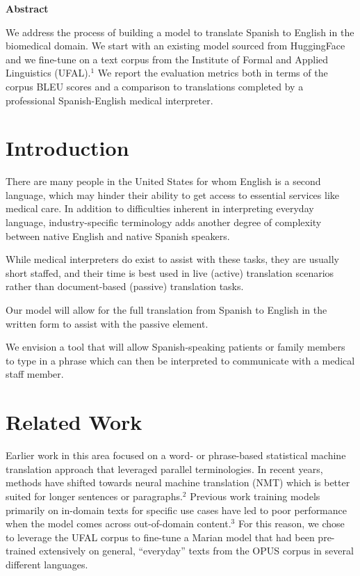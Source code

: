 \documentclass{article}
\begin{document}
\begin{multicols}{2}
\begingroup
\centering
    \textbf{Abstract}\\
\endgroup

We address the process of building a model to translate Spanish to English in the biomedical domain. We start with an existing model sourced from HuggingFace and we fine-tune on a text corpus from the Institute of Formal and Applied Linguistics (UFAL).$^{1}$  We report the evaluation metrics both in terms of the corpus BLEU scores and a comparison to translations completed by a professional Spanish-English medical interpreter.

\section{Introduction }
There are many people in the United States for whom English is a second language, which may hinder their ability to get access to essential services like medical care. In addition to difficulties inherent in interpreting everyday language, industry-specific terminology adds another degree of complexity between native English and native Spanish speakers. 

While medical interpreters do exist to assist with these tasks, they are usually short staffed, and their time is best used in live (active) translation scenarios rather than document-based (passive) translation tasks. 

\columnbreak %

Our model will allow for the full translation from Spanish to English in the  written form to assist with the passive element. 

We envision a tool that will allow Spanish-speaking patients or family members to type in a phrase which can then be interpreted to communicate with a medical staff member.

\section{Related Work}
Earlier work in this area focused on a word- or phrase-based statistical machine translation approach that leveraged parallel terminologies. In recent years, methods have shifted towards neural machine translation (NMT) which is better suited for longer sentences or paragraphs.$^{2}$  Previous work training models primarily on in-domain texts for specific use cases have led to poor performance when the model comes across out-of-domain content.$^{3}$ For this reason, we chose to leverage the UFAL corpus to fine-tune a Marian model that had been pre-trained extensively on general, “everyday” texts from the OPUS corpus  in several different languages.


\end{multicols}
\end{document}
